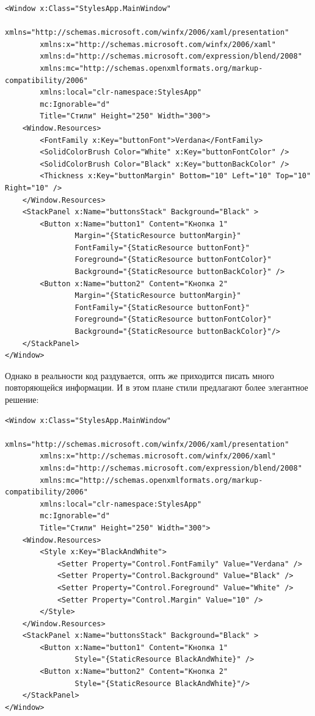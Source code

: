 \begin{verbatim}
<Window x:Class="StylesApp.MainWindow"
        xmlns="http://schemas.microsoft.com/winfx/2006/xaml/presentation"
        xmlns:x="http://schemas.microsoft.com/winfx/2006/xaml"
        xmlns:d="http://schemas.microsoft.com/expression/blend/2008"
        xmlns:mc="http://schemas.openxmlformats.org/markup-compatibility/2006"
        xmlns:local="clr-namespace:StylesApp"
        mc:Ignorable="d"
        Title="Стили" Height="250" Width="300">
    <Window.Resources>
        <FontFamily x:Key="buttonFont">Verdana</FontFamily>
        <SolidColorBrush Color="White" x:Key="buttonFontColor" />
        <SolidColorBrush Color="Black" x:Key="buttonBackColor" />
        <Thickness x:Key="buttonMargin" Bottom="10" Left="10" Top="10" Right="10" />
    </Window.Resources>
    <StackPanel x:Name="buttonsStack" Background="Black" >
        <Button x:Name="button1" Content="Кнопка 1"
                Margin="{StaticResource buttonMargin}"
                FontFamily="{StaticResource buttonFont}"
                Foreground="{StaticResource buttonFontColor}"
                Background="{StaticResource buttonBackColor}" />
        <Button x:Name="button2" Content="Кнопка 2"
                Margin="{StaticResource buttonMargin}"
                FontFamily="{StaticResource buttonFont}"
                Foreground="{StaticResource buttonFontColor}"
                Background="{StaticResource buttonBackColor}"/>
    </StackPanel>
</Window>
\end{verbatim}

Однако в реальности код раздувается, опть же приходится писать много повторяющейся информации. И в этом плане стили предлагают более элегантное решение:

\begin{verbatim}
<Window x:Class="StylesApp.MainWindow"
        xmlns="http://schemas.microsoft.com/winfx/2006/xaml/presentation"
        xmlns:x="http://schemas.microsoft.com/winfx/2006/xaml"
        xmlns:d="http://schemas.microsoft.com/expression/blend/2008"
        xmlns:mc="http://schemas.openxmlformats.org/markup-compatibility/2006"
        xmlns:local="clr-namespace:StylesApp"
        mc:Ignorable="d"
        Title="Стили" Height="250" Width="300">
    <Window.Resources>
        <Style x:Key="BlackAndWhite">
            <Setter Property="Control.FontFamily" Value="Verdana" />
            <Setter Property="Control.Background" Value="Black" />
            <Setter Property="Control.Foreground" Value="White" />
            <Setter Property="Control.Margin" Value="10" />
        </Style>
    </Window.Resources>
    <StackPanel x:Name="buttonsStack" Background="Black" >
        <Button x:Name="button1" Content="Кнопка 1"
                Style="{StaticResource BlackAndWhite}" />
        <Button x:Name="button2" Content="Кнопка 2"
                Style="{StaticResource BlackAndWhite}"/>
    </StackPanel>
</Window>
\end{verbatim}


